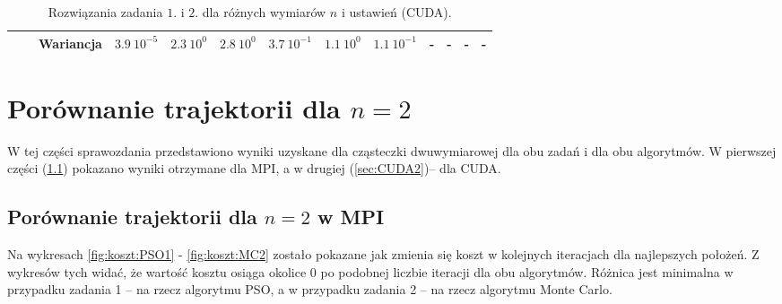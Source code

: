 \documentclass[11pt, a4paper, oneside]{article}
\begin{document}
\begin{table}[t]
\begin{adjustwidth}{-1.76cm}{}
\begin{tabular}{|c|c|c|l|l|l|l|l|l|c|c|c|c|}
                      &                            & Wariancja & $3.9 \ 10^{-5}$          & $2.3 \ 10^{0}$          & $2.8 \ 10^{0}$           & $3.7 \ 10^{-1}$         & $1.1 \ 10^{0}$           & $1.1 \ 10^{-1}$         & \textbf{-}                             & \textbf{-}                             & \textbf{-}                             & \textbf{-}                             \\ \hline
\end{tabular}
\end{adjustwidth}
\caption{Rozwiązania zadania $1$. i $2$. dla różnych wymiarów $n$ i ustawień (CUDA).}
\label{tab:CUDA}
\end{table}

\section{Porównanie trajektorii dla $n = 2$}

W tej części sprawozdania przedstawiono wyniki uzyskane dla cząsteczki dwuwymiarowej dla obu zadań i dla obu algorytmów. W pierwszej części (\ref{sec:MPI2}) pokazano wyniki otrzymane dla MPI, a w drugiej  (\ref{sec:CUDA2})-- dla CUDA.

\subsection{Porównanie trajektorii dla $n = 2$ w MPI} \label{sec:MPI2}

Na wykresach \ref{fig:koszt:PSO1} - \ref{fig:koszt:MC2} zostało pokazane jak zmienia się koszt w kolejnych iteracjach dla najlepszych położeń. Z wykresów tych widać, że wartość kosztu osiąga okolice 0 po podobnej liczbie iteracji dla obu algorytmów. Różnica jest minimalna w przypadku zadania 1 -- na rzecz algorytmu PSO, a w przypadku zadania 2 -- na rzecz algorytmu Monte Carlo.
\end{document}
